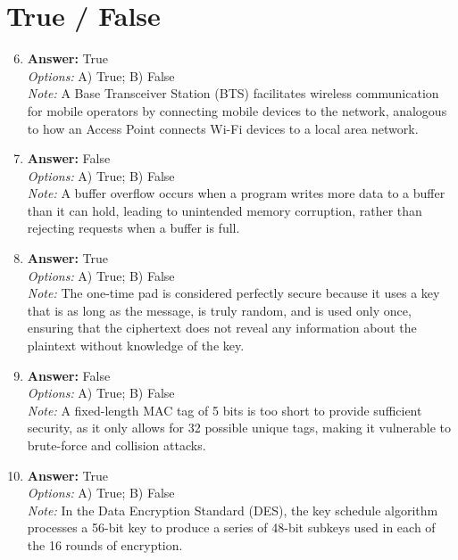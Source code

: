 \documentclass[12pt]{article}
\begin{document}
\section*{True / False}
\begin{enumerate}[label=\arabic*.]
\setcounter{enumi}{5}
\item \textbf{Answer:} True
\\ \textit{Options:} A) True; B) False
\\ \textit{Note:} A Base Transceiver Station (BTS) facilitates wireless communication for mobile operators by connecting mobile devices to the network, analogous to how an Access Point connects Wi-Fi devices to a local area network.
\item \textbf{Answer:} False
\\ \textit{Options:} A) True; B) False
\\ \textit{Note:} A buffer overflow occurs when a program writes more data to a buffer than it can hold, leading to unintended memory corruption, rather than rejecting requests when a buffer is full.
\item \textbf{Answer:} True
\\ \textit{Options:} A) True; B) False
\\ \textit{Note:} The one-time pad is considered perfectly secure because it uses a key that is as long as the message, is truly random, and is used only once, ensuring that the ciphertext does not reveal any information about the plaintext without knowledge of the key.
\item \textbf{Answer:} False
\\ \textit{Options:} A) True; B) False
\\ \textit{Note:} A fixed-length MAC tag of 5 bits is too short to provide sufficient security, as it only allows for 32 possible unique tags, making it vulnerable to brute-force and collision attacks.
\item \textbf{Answer:} True
\\ \textit{Options:} A) True; B) False
\\ \textit{Note:} In the Data Encryption Standard (DES), the key schedule algorithm processes a 56-bit key to produce a series of 48-bit subkeys used in each of the 16 rounds of encryption.
\end{enumerate}
\end{document}
